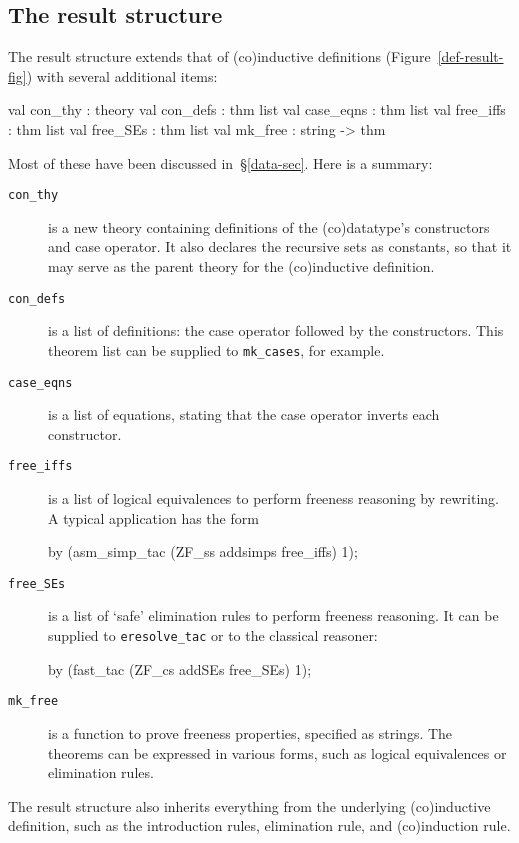 \subsection{The result structure}
The result structure extends that of (co)inductive definitions
(Figure~\ref{def-result-fig}) with several additional items:
\begin{ttbox}
val con_thy   : theory
val con_defs  : thm list
val case_eqns : thm list
val free_iffs : thm list
val free_SEs  : thm list
val mk_free   : string -> thm
\end{ttbox}
Most of these have been discussed in~\S\ref{data-sec}.  Here is a summary:
\begin{description}
\item[\tt con\_thy] is a new theory containing definitions of the
(co)datatype's constructors and case operator.  It also declares the
recursive sets as constants, so that it may serve as the parent
theory for the (co)inductive definition.

\item[\tt con\_defs] is a list of definitions: the case operator followed by
the constructors.  This theorem list can be supplied to \verb|mk_cases|, for
example.

\item[\tt case\_eqns] is a list of equations, stating that the case operator
inverts each constructor.

\item[\tt free\_iffs] is a list of logical equivalences to perform freeness
reasoning by rewriting.  A typical application has the form
\begin{ttbox}
by (asm_simp_tac (ZF_ss addsimps free_iffs) 1);
\end{ttbox}

\item[\tt free\_SEs] is a list of `safe' elimination rules to perform freeness
reasoning.  It can be supplied to \verb|eresolve_tac| or to the classical
reasoner:
\begin{ttbox} 
by (fast_tac (ZF_cs addSEs free_SEs) 1);
\end{ttbox}

\item[\tt mk\_free] is a function to prove freeness properties, specified as
strings.  The theorems can be expressed in various forms, such as logical
equivalences or elimination rules.
\end{description}

The result structure also inherits everything from the underlying
(co)inductive definition, such as the introduction rules, elimination rule,
and (co)induction rule.


